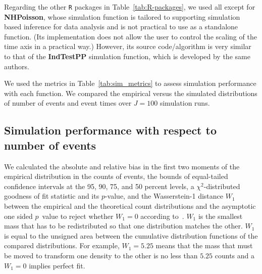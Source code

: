 \documentclass[10pt,letterpaper]{article}
\newcommand{\pkg}[1]{{\bf #1}}
\newcommand{\proglang}[1]{\texttt{#1}}
\begin{document}
Regarding the other \proglang{R} packages in Table~\ref{tab:R-packages}, we used all except for \pkg{NHPoisson}, whose simulation function is tailored to supporting simulation based inference for data analysis and is not practical to use as a standalone function.
(Its implementation does not allow the user to control the scaling of the time axis in a practical way.)
However, its source code/algorithm is very similar to that of the \pkg{IndTestPP} simulation function, which is developed by the same authors.

We used the metrics in Table~\ref{tab:sim_metrics} to assess simulation performance with each function. We compared the empirical versus the simulated distributions of number of events and event times over $J = 100$ simulation runs.

\subsection{Simulation performance with respect to number of events}\label{sec:sim-counts}

We calculated the absolute and relative bias in the first two moments of the empirical distribution in the counts of events, the bounds of equal-tailed confidence intervals at the 95, 90, 75, and 50 percent levels, a $\chi^2$-distributed goodness of fit statistic and its $p$-value, and the Wasserstein-1 distance $W_1$ between the empirical and the theoretical count distributions and the asymptotic one sided $p$~value to reject whether $W_1 = 0$ according to~\cite{sommerfeld2018inference}. $W_1$ is the smallest mass that has to be redistributed so that one distribution matches the other. $W_1$ is equal to the unsigned area between the cumulative distribution functions of the compared distributions. For example, $W_1 = 5.25$ means that the mass that must be moved to transform one density to the other is no less than $5.25$ counts and a $W_1 = 0$ implies perfect fit.
\end{document}
